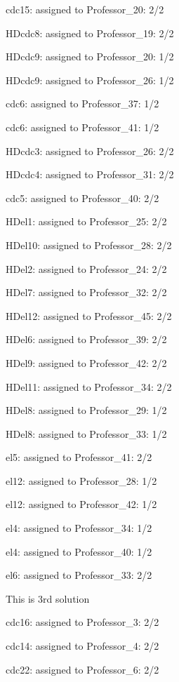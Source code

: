 \documentclass{article} %
\begin{document}
\noindent cdc15: assigned to Professor\_20: 2/2

\noindent HDcdc8: assigned to Professor\_19: 2/2

\noindent HDcdc9: assigned to Professor\_20: 1/2

\noindent HDcdc9: assigned to Professor\_26: 1/2

\noindent cdc6: assigned to Professor\_37: 1/2

\noindent cdc6: assigned to Professor\_41: 1/2

\noindent HDcdc3: assigned to Professor\_26: 2/2

\noindent HDcdc4: assigned to Professor\_31: 2/2

\noindent cdc5: assigned to Professor\_40: 2/2

\noindent HDel1: assigned to Professor\_25: 2/2

\noindent HDel10: assigned to Professor\_28: 2/2

\noindent HDel2: assigned to Professor\_24: 2/2

\noindent HDel7: assigned to Professor\_32: 2/2

\noindent HDel12: assigned to Professor\_45: 2/2

\noindent HDel6: assigned to Professor\_39: 2/2

\noindent HDel9: assigned to Professor\_42: 2/2

\noindent HDel11: assigned to Professor\_34: 2/2

\noindent HDel8: assigned to Professor\_29: 1/2

\noindent HDel8: assigned to Professor\_33: 1/2

\noindent el5: assigned to Professor\_41: 2/2

\noindent el12: assigned to Professor\_28: 1/2

\noindent el12: assigned to Professor\_42: 1/2

\noindent el4: assigned to Professor\_34: 1/2

\noindent el4: assigned to Professor\_40: 1/2

\noindent el6: assigned to Professor\_33: 2/2

\noindent 

\noindent  This is 3rd solution

\noindent cdc16: assigned to Professor\_3: 2/2

\noindent cdc14: assigned to Professor\_4: 2/2

\noindent cdc22: assigned to Professor\_6: 2/2
\end{document}
